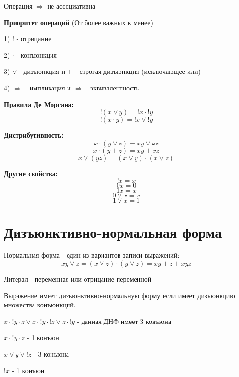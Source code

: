 \documentclass{article}
\begin{document}
Операция $\Rightarrow$ не ассоциативна

\textbf {Приоритет операций} (От более важных к менее):

1) $!$ - отрицание

2) $\cdot$ - конъюнкция 

3) $\vee$ - дизъюнкция и $+$ - строгая дизъюнкция (исключающее или)

4) $\Rightarrow$ - импликация и $\Leftrightarrow$ - эквивалентность

\textbf {Правила Де Моргана:}
\[!(x \vee y) = !x \cdot !y\]
\[!(x \cdot y) = !x \vee !y\]

\textbf {Дистрибутивность:}
\[ x \cdot (y \vee z) = xy \vee xz\]
\[ x \cdot (y + z) = xy + xz\]
\[ x \vee (yz) = (x \vee y)\cdot(x \vee z)\]

\textbf {Другие свойства:}
\[ !x = x \]
\[ 0x = 0\]
\[ 1x = x\]
\[ 0 \vee x = x\]
\[ 1 \vee x = 1\]

\section{Дизъюнктивно-нормальная форма}

Нормальная форма - один из вариантов записи выражений:
\[ xy \vee z = (x \vee z)\cdot(y \vee z) = xy + z + xyz\]

Литерал - переменная или отрицание переменной 

Выражение имеет дизъюнктивно-нормальную форму если имеет дизъюнкцию множества конъюнкций:

 $x \cdot !y \cdot z \vee x \cdot !y \cdot !z \vee z \cdot !y$ - данная ДНФ имеет 3 конъюна

$x \cdot !y \cdot z$ - 1 конъюн

$x \vee y \vee !z$ - 3 конъюна 

$!x$ - 1 конъюн
\end{document}
